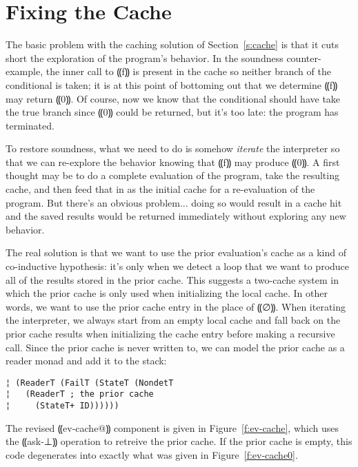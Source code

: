 \section{Fixing the Cache}\label{s:fixing-cache}

The basic problem with the caching solution of Section~\ref{s:cache} is that
it cuts short the exploration of the program's behavior.  In the
soundness counter-example, the inner call to ⸨f⸩ is present in
the cache so neither branch of the conditional is taken; it is at this
point of bottoming out that we determine ⸨f⸩ may return
⸨0⸩.  Of course, now we know that the conditional should have
take the true branch since ⸨0⸩ could be returned, but it's too
late: the program has terminated.

To restore soundness, what we need to do is somehow \emph{iterate} the
interpreter so that we can re-explore the behavior knowing that
⸨f⸩ may produce ⸨0⸩.  A first thought may be to do a
complete evaluation of the program, take the resulting cache, and then
feed that in as the initial cache for a re-evaluation of the program.
But there's an obvious problem... doing so would result in a cache hit
and the saved results would be returned immediately without exploring
any new behavior.

The real solution is that we want to use the prior evaluation's cache
as a kind of co-inductive hypothesis: it's only when we detect a loop
that we want to produce all of the results stored in the prior cache.
This suggests a two-cache system in which the prior cache is only used
when initializing the local cache.  In other words, we want to use the
prior cache entry in the place of ⸨∅⸩.  When iterating the
interpreter, we always start from an empty local cache and fall back
on the prior cache results when initializing the cache entry before
making a recursive call.  Since the prior cache is never written to,
we can model the prior cache as a reader monad and add it to the
stack:
\begin{lstlisting}
¦ (ReaderT (FailT (StateT (NondetT 
¦   (ReaderT ; the prior cache
¦     (StateT+ ID))))))
\end{lstlisting}

The revised ⸨ev-cache@⸩ component is given in Figure~\ref{f:ev-cache}, which
uses the ⸨ask-⊥⸩ operation to retreive the prior cache.  If the
prior cache is empty, this code degenerates into exactly what was given in
Figure~\ref{f:ev-cache0}.

